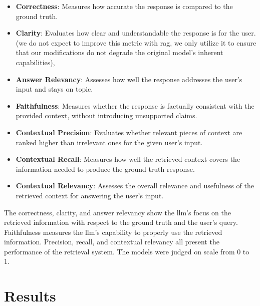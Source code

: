 \documentclass[fleqn,moreauthors,10pt]{ds_report}
\begin{document}
\begin{itemize}
	\item \textbf{Correctness}: Measures how accurate the response is compared to the ground truth.

	\item \textbf{Clarity}: Evaluates how clear and understandable the response is for the user. (we do not expect to improve this metric with \ac{rag}, we only utilize it to ensure that our modifications do not degrade the original model's inherent capabilities),
	
	\item \textbf{Answer Relevancy}: Assesses how well the response addresses the user's input and stays on topic.
	
	\item \textbf{Faithfulness}: Measures whether the response is factually consistent with the provided context, without introducing unsupported claims.
	
	\item \textbf{Contextual Precision}: Evaluates whether relevant pieces of context are ranked higher than irrelevant ones for the given user's input.
	
	\item \textbf{Contextual Recall}: Measures how well the retrieved context covers the information needed to produce the ground truth response.
	
	\item \textbf{Contextual Relevancy}: Assesses the overall relevance and usefulness of the retrieved context for answering the user's input.

\end{itemize} 

The correctness, clarity, and answer relevancy show the \ac{llm}'s focus on the retrieved information with respect to the ground truth and the user's query. Faithfulness measures the \ac{llm}'s capability to properly use the retrieved information. Precision, recall, and contextual relevancy all present the performance of the retrieval system. The models were judged on scale from 0 to 1. 

\section*{Results}
\end{document}
